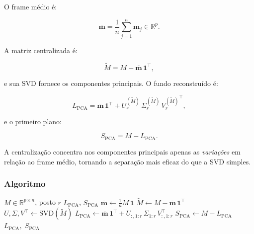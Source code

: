 \documentclass[12pt, a4paper]{article}
\begin{document}
O frame médio é:

\begin{equation}
  \bar{\mathbf{m}} = \frac{1}{n}\sum_{j=1}^{n} \mathbf{m}_j \in \mathbb{R}^p.
  \label{eq:mean_frame}
\end{equation}

A matriz centralizada é:

\begin{equation}
  \tilde{M} = M - \bar{\mathbf{m}}\,\mathbf{1}^\top,
  \label{eq:centered}
\end{equation}

e sua SVD fornece os componentes principais. O fundo reconstruído é:

\begin{equation}
  L_{\mathrm{PCA}} = \bar{\mathbf{m}}\,\mathbf{1}^\top
                   + U_r^{(\tilde{M})}\,\Sigma_r^{(\tilde{M})}\,{V_r^{(\tilde{M})}}^\top,
  \label{eq:pca_bg}
\end{equation}

e o primeiro plano:

\begin{equation}
  S_{\mathrm{PCA}} = M - L_{\mathrm{PCA}}.
  \label{eq:pca_fg}
\end{equation}

A centralização concentra nos componentes principais apenas as \emph{variações}
em relação ao frame médio, tornando a separação mais eficaz do que a SVD simples.

\subsubsection{Algoritmo}

\begin{algorithm}[H]
\caption{PCA Clássico para Remoção de Fundo}
\label{alg:pca}
\begin{algorithmic}[1]
  \Require $M \in \mathbb{R}^{p \times n}$, posto $r$
  \Ensure $L_{\mathrm{PCA}}$, $S_{\mathrm{PCA}}$
  \State $\bar{\mathbf{m}} \leftarrow \frac{1}{n} M\,\mathbf{1}$
  \State $\tilde{M} \leftarrow M - \bar{\mathbf{m}}\,\mathbf{1}^\top$
  \State $U, \Sigma, V^\top \leftarrow \mathrm{SVD}(\tilde{M})$
  \State $L_{\mathrm{PCA}} \leftarrow \bar{\mathbf{m}}\,\mathbf{1}^\top + U_{:,1:r}\,\Sigma_{1:r}\,V_{:,1:r}^\top$
  \State $S_{\mathrm{PCA}} \leftarrow M - L_{\mathrm{PCA}}$
  \Return $L_{\mathrm{PCA}},\; S_{\mathrm{PCA}}$
\end{algorithmic}
\end{algorithm}
\end{document}
